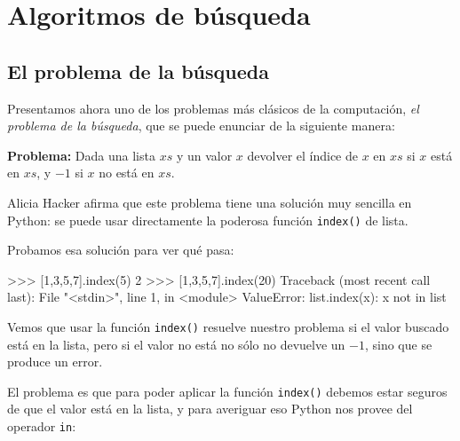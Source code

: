 
%

\chapter[Algoritmos de búsqueda]{Algoritmos de búsqueda}

\section{El problema de la búsqueda}

Presentamos ahora uno de los problemas más clásicos de la computación, {\it el
problema de la búsqueda}, que se puede enunciar de la siguiente manera:

{\bf Problema: } Dada una lista $xs$ y un valor $x$ devolver el índice de $x$
en $xs$ si $x$ está en $xs$, y $-1$ si $x$ no está en $xs$.

Alicia Hacker afirma que este problema tiene una solución muy sencilla en
Python: se puede usar directamente la poderosa función \lstinline+index()+ de
lista.

Probamos esa solución para ver qué pasa:

\begin{codigo-python-sn}
>>> [1,3,5,7].index(5)
2
>>> [1,3,5,7].index(20)
Traceback (most recent call last):
  File "<stdin>", line 1, in <module>
ValueError: list.index(x): x not in list
\end{codigo-python-sn}

Vemos que usar la función \lstinline+index()+ resuelve nuestro problema si el
valor buscado está en la lista, pero si el valor no está no sólo no devuelve
un $-1$, sino que se produce un error.

El problema es que para poder aplicar la función \lstinline+index()+ debemos
estar seguros de que el valor está en la lista, y para averiguar eso Python
nos provee del operador \lstinline+in+:

